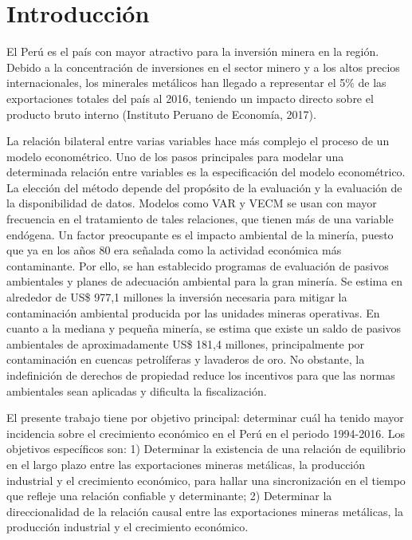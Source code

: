 \documentclass[11pt,]{article}
\begin{document}
\vskip 6.5pt


\noindent  \hypertarget{introduccion}{%
\section{Introducción}\label{introduccion}}

El Perú es el país con mayor atractivo para la inversión minera en la
región. Debido a la concentración de inversiones en el sector minero y a
los altos precios internacionales, los minerales metálicos han llegado a
representar el 5\% de las exportaciones totales del país al 2016,
teniendo un impacto directo sobre el producto bruto interno (Instituto
Peruano de Economía, 2017).

La relación bilateral entre varias variables hace más complejo el
proceso de un modelo econométrico. Uno de los pasos principales para
modelar una determinada relación entre variables es la especificación
del modelo econométrico. La elección del método depende del propósito de
la evaluación y la evaluación de la disponibilidad de datos. Modelos
como VAR y VECM se usan con mayor frecuencia en el tratamiento de tales
relaciones, que tienen más de una variable endógena. Un factor
preocupante es el impacto ambiental de la minería, puesto que ya en los
años 80 era señalada como la actividad económica más contaminante. Por
ello, se han establecido programas de evaluación de pasivos ambientales
y planes de adecuación ambiental para la gran minería. Se estima en
alrededor de US\$ 977,1 millones la inversión necesaria para mitigar la
contaminación ambiental producida por las unidades mineras operativas.
En cuanto a la mediana y pequeña minería, se estima que existe un saldo
de pasivos ambientales de aproximadamente US\$ 181,4 millones,
principalmente por contaminación en cuencas petrolíferas y lavaderos de
oro. No obstante, la indefinición de derechos de propiedad reduce los
incentivos para que las normas ambientales sean aplicadas y dificulta la
fiscalización.

El presente trabajo tiene por objetivo principal: determinar cuál ha
tenido mayor incidencia sobre el crecimiento económico en el Perú en el
periodo 1994-2016. Los objetivos específicos son: 1) Determinar la
existencia de una relación de equilibrio en el largo plazo entre las
exportaciones mineras metálicas, la producción industrial y el
crecimiento económico, para hallar una sincronización en el tiempo que
refleje una relación confiable y determinante; 2) Determinar la
direccionalidad de la relación causal entre las exportaciones mineras
metálicas, la producción industrial y el crecimiento económico.
\end{document}
